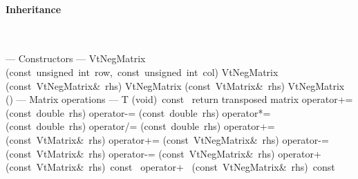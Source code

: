 \documentclass{article}
\begin{document}
\begin{cxxentry}
\begin{cxxclass}
\begin{cxxInheritance}
\paragraph{Inheritance}\strut\smallskip\strut\\
\end{cxxInheritance}
\begin{cxxpublic}
\cxxitem{}
        {--- Constructors --- }
        {}
        {}
        {}
\label{cxx.2.5.1}
\cxxitem{}
        {VtNegMatrix}
        {(const\ unsigned\ int\ row,\ const\ unsigned\ int\ col)}
        {}
        {}
\label{cxx.2.5.2}
\cxxitem{}
        {VtNegMatrix}
        {(const\ VtNegMatrix\&\ rhs)}
        {}
        {}
\label{cxx.2.5.3}
\cxxitem{}
        {VtNegMatrix}
        {(const\ VtMatrix\&\ rhs)}
        {}
        {}
\label{cxx.2.5.4}
\cxxitem{}
        {\cxxtilde VtNegMatrix}
        {()}
        {}
        {}
\label{cxx.2.5.5}
\cxxitem{}
        {--- Matrix operations --- }
        {}
        {}
        {}
\label{cxx.2.5.6}
        {T}
        {(void)\ const\ }
        { return transposed matrix}
        {}
\label{cxx.2.5.7}
        {operator+=}
        {(const\ double\ rhs)}
        {}
        {}
\label{cxx.2.5.8}
        {operator-=}
        {(const\ double\ rhs)}
        {}
        {}
\label{cxx.2.5.9}
        {operator*=}
        {(const\ double\ rhs)}
        {}
        {}
\label{cxx.2.5.10}
        {operator/=}
        {(const\ double\ rhs)}
        {}
        {}
\label{cxx.2.5.11}
        {operator+=}
        {(const\ VtMatrix\&\ rhs)}
        {}
        {}
\label{cxx.2.5.12}
        {operator+=}
        {(const\ VtNegMatrix\&\ rhs)}
        {}
        {}
\label{cxx.2.5.13}
        {operator-=}
        {(const\ VtMatrix\&\ rhs)}
        {}
        {}
\label{cxx.2.5.14}
        {operator-=}
        {(const\ VtNegMatrix\&\ rhs)}
        {}
        {}
\label{cxx.2.5.15}
        {operator+\ }
        {(const\ VtMatrix\&\ rhs)\ const\ }
        {}
        {}
\label{cxx.2.5.16}
        {operator+\ }
        {(const\ VtNegMatrix\&\ rhs)\ const\ }
        {}
        {}
\label{cxx.2.5.17}

\end{cxxpublic}
\end{cxxclass}
\end{cxxentry}
\end{document}

